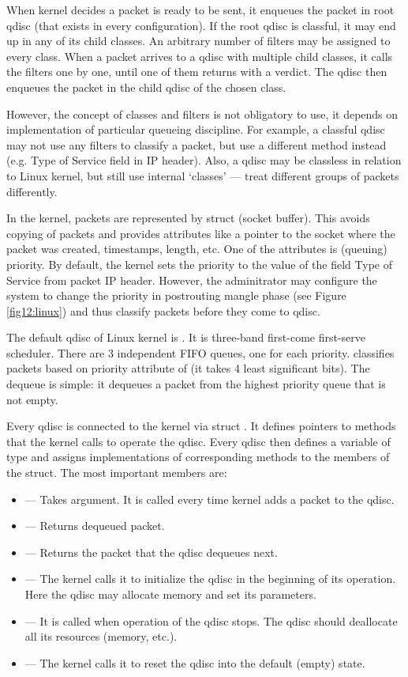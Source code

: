 When kernel decides a packet is ready to be sent, it enqueues the packet in root qdisc (that exists in every configuration). If the root qdisc is classful, it may end up in any of its child classes. An arbitrary number of filters may be assigned to every class. When a packet arrives to a qdisc with multiple child classes, it calls the filters one by one, until one of them returns with a verdict. The qdisc then enqueues the packet in the child qdisc of the chosen class.

However, the concept of classes and filters is not obligatory to use, it depends on implementation of particular queueing discipline. For example, a classful qdisc may not use any filters to classify a packet, but use a different method instead (e.g. Type of Service field in IP header). Also, a qdisc may be classless in relation to Linux kernel, but still use internal `classes' --- treat different groups of packets differently.

In the kernel, packets are represented by struct  (socket buffer). This avoids copying of packets and provides attributes like a pointer to the socket where the packet was created, timestamps, length, etc. One of the attributes is (queuing) priority. By default, the kernel sets the priority to the value of the field Type of Service from packet IP header. However, the adminitrator may configure the system to change the priority in postrouting mangle phase (see Figure \ref{fig12:linux}) and thus classify packets before they come to qdisc.

The default qdisc of Linux kernel is . It is three-band first-come first-serve scheduler. There are 3 independent FIFO queues, one for each priority.  classifies packets based on priority attribute of  (it takes 4 least significant bits). The dequeue is simple: it dequeues a packet from the highest priority queue that is not empty.

Every qdisc is connected to the kernel via struct . It defines pointers to methods that the kernel calls to operate the qdisc. Every qdisc then defines a variable of type  and assigns implementations of corresponding methods to the members of the struct. The most important members are:
\begin{itemize}
	\item {} --- Takes  argument. It is called every time kernel adds a packet to the qdisc.
	\item {} --- Returns dequeued packet.
	\item {} --- Returns the packet that the qdisc dequeues next.
	\item {} --- The kernel calls it to initialize the qdisc in the beginning of its operation. Here the qdisc may allocate memory and set its parameters.
	\item {} --- It is called when operation of the qdisc stops. The qdisc should deallocate all its resources (memory, etc.).
	\item {} --- The kernel calls it to reset the qdisc into the default (empty) state.
\end{itemize}

